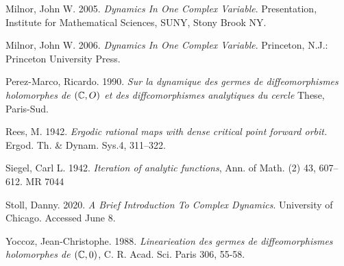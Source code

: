 \documentclass[../main.tex]{subfiles}
\begin{document}
\begin{thebibliography}{9}
Milnor, John W. 2005. \textit{Dynamics In One Complex Variable}. Presentation, Institute for Mathematical Sciences, SUNY, Stony Brook NY.

Milnor, John W. 2006. \textit{Dynamics In One Complex Variable}. Princeton, N.J.: Princeton University Press.

Perez-Marco, Ricardo. 1990. \textit{Sur la dynamique des germes de diffeomorphismes holomorphes de $(\mathbb{C},O)$ et des diffcomorphismes analytiques du cercle}
These, Paris-Sud.

Rees, M. 1942. \textit{Ergodic rational maps with dense critical point forward orbit.} Ergod. Th. \& Dynam. Sys.4, 311–322.



Siegel, Carl L. 1942. \textit{Iteration of analytic functions}, Ann. of Math. (2) 43, 607–612. MR 7044



Stoll, Danny. 2020. \textit{A Brief Introduction To Complex Dynamics}. University of Chicago. Accessed June 8.

Yoccoz, Jean-Christophe. 1988. \textit{Linearieation des germes de diffeomorphismes holomorphes de $(\mathbb{C}, 0)$}, C. R. Acad. Sci. Paris 306, 55-58.

\end{thebibliography}
\end{document}
